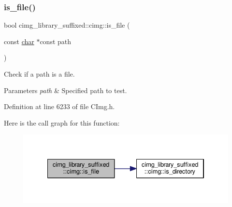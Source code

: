 \subsubsection{\texorpdfstring{is\+\_\+file()}{is\_file()}}
{\footnotesize\ttfamily bool cimg\+\_\+library\+\_\+suffixed\+::cimg\+::is\+\_\+file (\begin{DoxyParamCaption}\item[{const \hyperlink{classchar}{char} $\ast$const}]{path }\end{DoxyParamCaption})\hspace{0.3cm}{\ttfamily [inline]}}



Check if a path is a file. 


\begin{DoxyParams}{Parameters}
{\em path} & Specified path to test. \\
\hline
\end{DoxyParams}


Definition at line 6233 of file C\+Img.\+h.

Here is the call graph for this function\+:
\nopagebreak
\begin{figure}[H]
\begin{center}
\leavevmode
\includegraphics[width=334pt]{d4/d9b/namespacecimg__library__suffixed_1_1cimg_ad6c9ae2aaaf60bdecbd5c8f57ee5617e_cgraph}
\end{center}
\end{figure}
\mbox{\label{namespacecimg__library__suffixed_1_1cimg_a90c05fe6fc049cba75f3a12807e97158}} 
